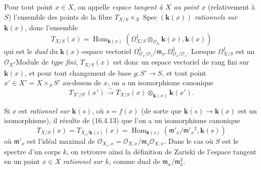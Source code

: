 \begin{env}[16.5.13]
Pour tout point $x\in X$, on appelle \emph{espace tangent à $X$ au point $x$}
(relativement à $S$) l'ensemble des points de la fibre
$T_{X/S}\times_X\operatorname{Spec}(\boldsymbol{k}(x))$ \emph{rationnels sur $\boldsymbol{k}(x)$}, donc
l'ensemble
\[
  T_{X/S}(x)=
  \operatorname{Hom}_{\mathbf{k}(x)}
  (\varOmega_{X/S}^1\otimes_{\mathcal{O}_X}\boldsymbol{k}(x),\boldsymbol{k}(x))
  \tag{16.5.13.1}
  \label{IV.16.5.13.1}
\]
qui est le \emph{dual} du $\boldsymbol{k}(x)$-espace vectoriel
$\Omega_{\mathcal{O}_x/\mathcal{O}_s}^1/
\mathfrak{m}_x.\Omega_{\mathcal{O}_x/\mathcal{O}_s}^1$. Lorsque
$\varOmega_{X/S}^1$ est un $\mathcal{O}_X$-Module de \emph{type fini},
$T_{X/S}(x)$ est donc un espace vectoriel de rang fini sur $\boldsymbol{k}(x)$, et pour
tout
changement de base $g:S'\to S$, et tout point
$x'\in X'=X\times_S S'$ au-dessus de $x$, on a un isomorphisme canonique
\[
  T_{X'/S'}(x')\xrightarrow{\sim}
  T_{X/S}(x)\otimes_{\mathbf{k}(x)}\boldsymbol{k}(x').
  \tag{16.5.13.2}
  \label{IV.16.5.13.2}
\]

Si $x$ est \emph{rationnel sur $\boldsymbol{k}(s)$}, où $s=f(x)$ (de sorte que
$\boldsymbol{k}(s)\to \boldsymbol{k}(x)$ est un isomorphisme), il résulte de (16.4.13) que l'on a un
isomorphisme canonique
\[
  T_{X/S}(x)=T_{X_s/\mathbf{k}(s)}(x)
  =\operatorname{Hom}_{\mathbf{k}(s)}
  (\mathfrak{m}'_x/\mathfrak{m}'_x{}^2,\boldsymbol{k}(s))
  \tag{16.5.13.3}
  \label{IV.16.5.13.3}
\]
où $\mathfrak{m}'_x$ est l'idéal maximal de
$\mathcal{O}_{X_s,x}=\mathcal{O}_{X,x}/
\mathfrak{m}_s\mathcal{O}_{X,x}$. Dans le cas où $S$ est le spectre d'un corps
$k$, on retrouve ainsi la définition de Zariski de l'espace tangent en un
point $x\in X$ \emph{rationnel sur $k$}, comme dual de
$\mathfrak{m}_x/\mathfrak{m}_x^2$.


\end{env}
